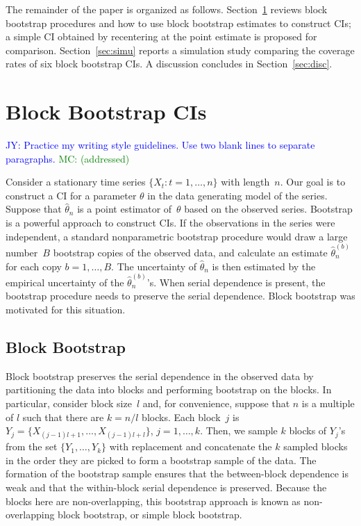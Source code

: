 \documentclass[12pt, letterpaper, titlepage]{article}
\newcommand{\jy}[1]{\textcolor{blue}{JY: #1}}
\newcommand{\mc}[1]{\textcolor{green}{MC: (#1)}}
\begin{document}
The remainder of the paper is organized as follows.
Section~\ref{sec:bbci} reviews block bootstrap procedures and how to use block
bootstrap estimates to construct CIs; a simple CI obtained by recentering at the
point estimate is proposed for comparison. Section~\ref{sec:simu} reports a
simulation
study comparing the coverage rates of six block bootstrap CIs. A discussion
concludes in Section~\ref{sec:disc}.


\section{Block Bootstrap CIs}
\label{sec:bbci}


\jy{Practice my writing style guidelines. Use two blank lines to separate
  paragraphs.} \mc{addressed}


Consider a stationary time series $\{X_t: t = 1, \ldots, n\}$ with length~$n$.
Our goal is to construct a CI for a parameter $\theta$ in the
data generating model of the series. Suppose that $\hat\theta_n$ is a point
estimator of~$\theta$ based on the observed series. Bootstrap is a powerful
approach to construct CIs. If the observations in the series
were independent, a standard nonparametric bootstrap procedure would draw a
large number~$B$ bootstrap copies of the observed data, and calculate an
estimate $\hat\theta_n^{(b)}$ for each copy $b = 1, \ldots, B$. The uncertainty
of $\hat\theta_n$ is then estimated by the empirical uncertainty of the
$\hat\theta_n^{(b)}$'s. When serial dependence is present, the bootstrap
procedure needs to preserve the serial dependence. Block bootstrap was
motivated for this situation. 


\subsection{Block Bootstrap}


Block bootstrap preserves the serial dependence in the observed data by
partitioning the data into blocks and performing bootstrap on the blocks.
In particular, consider block size~$l$ and, for convenience, suppose that
$n$ is a multiple of $l$ such that there are $k = n / l$ blocks. Each block~$j$
is $Y_j = \{X_{(j - 1) l + 1}, \ldots, X_{(j - 1) l + l}\}$,
$j = 1, \ldots,   k$.  Then, we sample $k$ blocks of $Y_j$'s from the set 
$\{Y_1, \ldots, Y_k\}$ with replacement and concatenate the $k$ sampled blocks
in the order they are picked to form a bootstrap sample of the data. The
formation of the bootstrap sample ensures that the between-block dependence
is weak and that the within-block serial dependence is preserved. Because the
blocks here are non-overlapping, this bootstrap approach is known as
non-overlapping block bootstrap, or simple block bootstrap.
\end{document}
